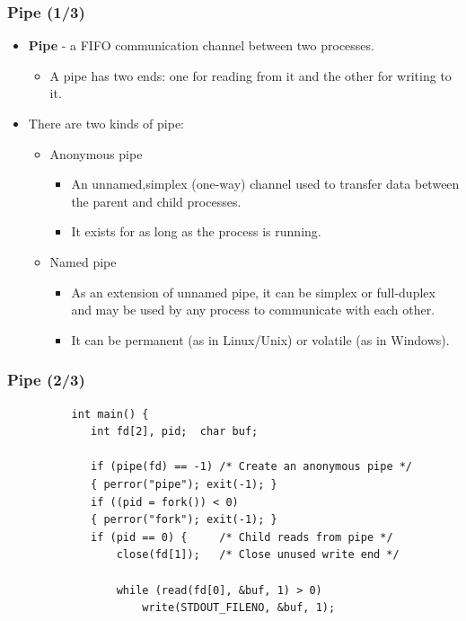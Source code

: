 \documentclass[CJKutf8,xcolor=pdftex,dvipsnames,table]{beamer}
\begin{document}
\begin{CJK*}{UTF8}{song}
  \begin{frame}
  \frametitle{Pipe (1/3)} \pause
  \begin{itemize}
  \item{\textbf{Pipe} \pause - a FIFO communication channel between two processes.} \pause
    \begin{itemize}
    \item{A pipe has two ends: one for reading from it and the other for writing to it.} \pause
    \end{itemize}
  \item{There are two kinds of pipe:} \pause
    \begin{itemize}
    \item{Anonymous pipe} \pause
      \begin{itemize}
      \item{An unnamed,simplex (one-way) channel used to transfer data between the parent and child processes.} \pause
      \item{It exists for as long as the process is running.} \pause
      \end{itemize}
    \item{Named pipe} \pause
      \begin{itemize}
      \item{As an extension of unnamed pipe, it can be simplex or full-duplex and may be used by any process to communicate with each other.} \pause
      \item{It can be permanent (as in Linux/Unix) or volatile (as in Windows).}
      \end{itemize}
    \end{itemize}
  \end{itemize}
  \end{frame}

  \begin{frame}[fragile]%
  \frametitle{Pipe (2/3)} \pause
\begin{lstlisting}
          int main() {
             int fd[2], pid;  char buf;
             
             if (pipe(fd) == -1) /* Create an anonymous pipe */
             { perror("pipe"); exit(-1); }
             if ((pid = fork()) < 0)
             { perror("fork"); exit(-1); }
             if (pid == 0) {     /* Child reads from pipe */
                 close(fd[1]);   /* Close unused write end */

                 while (read(fd[0], &buf, 1) > 0)
                     write(STDOUT_FILENO, &buf, 1);


\end{lstlisting}
\end{frame}
\end{CJK*}
\end{document}
